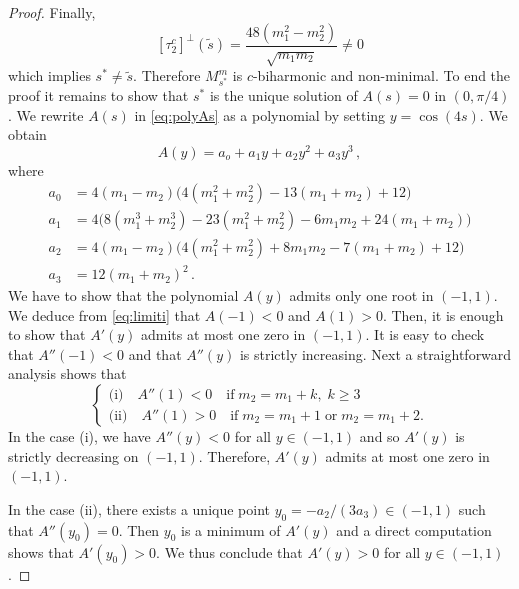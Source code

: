 \documentclass[10pt,a4paper]{amsart}
\begin{document}
\begin{proof}
Finally, 
\[
[\tau_2^c]^\perp(\tilde{s})= \frac{48 (m_1^2-m_2^2)}{\sqrt{m_1 m_2}}   \neq 0
\]
which implies $s^*\neq \tilde{s}$. Therefore $M_{s^*}^m$ is $c$-biharmonic and non-minimal.
To end the proof it remains to show that $s^*$ is the unique solution of $A(s)=0$ in $(0,\pi/4)$. We rewrite $A(s)$ in \eqref{eq:polyAs} as a polynomial by setting $y=\cos(4s)$.  We obtain
\begin{equation}\label{eq:polyAy}
A(y)=a_o+a_1y+a_2y^2+a_3y^3\,,
\end{equation}
where
\[
\begin{aligned}
a_0 &= 4 (m_1 - m_2) \big(4(m_1^2+m_2^2)-13(m_1+m_2)+12\big)\\
a_1 &=  4 \big(8 (m_1^3+ m_2^3) -23(m_1^2+m_2^2)-6m_1 m_2+24(m_1+m_2)\big)\\
a_2 &= 4 (m_1 - m_2) \big(4(m_1^2+m_2^2)+8m_1 m_2-7(m_1+m_2)+12\big)\\
a_3 &= 12 (m_1 + m_2)^2\,.
\end{aligned}
\]
We have to show that the polynomial $A(y)$ admits only one root in $(-1,1)$. We deduce from \eqref{eq:limiti} that  $A(-1)<0$  and $A(1)>0$.
Then, it is enough to show that $A'(y)$ admits at most one zero in $(-1,1)$. It is easy to check that $A''(-1)<0$ and that $A''(y)$ is strictly increasing. Next a straightforward analysis shows that
\[
\begin{cases}  \text{(i)} \quad A''(1)<0 \quad \text{if}\; m_2=m_1+k, \; k\geq 3\\ 
\text{(ii)} \quad A''(1)>0 \quad \text{if}\; m_2=m_1+1 \;\text{or}\; m_2=m_1+2.
\end{cases}
\]
In the case (i), we have $A''(y)<0$ for all $y\in (-1,1)$ and so $A'(y)$ is strictly decreasing on $(-1,1)$. Therefore, $A'(y)$ admits at most one zero in $(-1,1)$.

In the case (ii), there exists a unique point $y_0=-a_2/(3a_3)\in(-1,1)$ such that $A''(y_0)=0$. Then $y_0$ is a minimum of $A'(y)$ and a direct computation shows that $A'(y_0)>0$. We thus conclude that $A'(y)>0$ for all $y\in(-1,1)$.
\end{proof}
\end{document}
